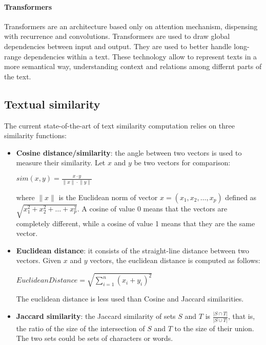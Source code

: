 \documentclass[\main/main.tex]{subfiles}
\begin{document}
\paragraph{Transformers}
Transformers are an architecture based only on attention mechanism, dispensing with recurrence and convolutions. Transformers are used to draw global dependencies between input and output. They are used to better handle long-range dependencies within a text. These technology allow to represent texts in a more semantical way, understanding context and relations among differnt parts of the text. \cite{vaswani2017attention}
\subsection{Textual similarity}
The current state-of-the-art of text similarity computation relies on three similarity functions:
\begin{itemize}
    \item \textbf{Cosine distance/similarity}: the angle between two vectors is used to measure their similarity. Let $x$ and $y$ be two vectors for comparison:
    \begin{center}
        $sim(x, y) = \frac{x \cdot y}{\lVert x \rVert \cdot \lVert y \rVert}$
    \end{center}
    where $\lVert x \rVert$ is the Euclidean norm of vector $x = (x_1, x_2,\dots, x_p)$ defined as \\$\sqrt{x^2_1 + x^2_2 + \dots + x^2_p}$. A cosine of value $0$ means that the vectors are completely different, while a cosine of value 1 means that they are the same vector. \cite{cosine_HAN201239}
    \item \textbf{Euclidean distance}: it consists of the straight-line distance between two vectors. Given $x$ and $y$ vectors, the euclidean distance is computed as follows:
    \begin{center}
        $Euclidean Distance = \sqrt{\sum\limits_{i=1}^n (x_i+y_i)^2}$
    \end{center}
    The euclidean distance is less used than Cosine and Jaccard similarities.
    \item \textbf{Jaccard similarity}: the Jaccard similarity of sets $S$ and $T$ is $\frac{| S \cap T|}{|S \cup T|}$, that is, the ratio of the size of the intersection of $S$ and $T$ to the size of their union.\cite{leskovec_rajaraman_ullman_2020}\\
    The two sets could be sets of characters or words.
\end{itemize}
\end{document}

